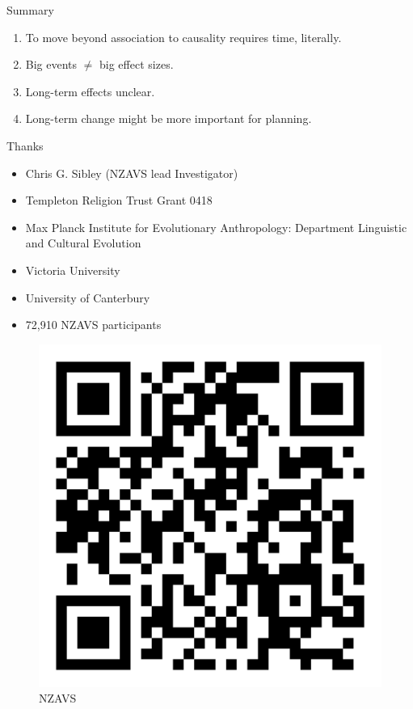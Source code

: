 \documentclass[
  ignorenonframetext,
  aspectratio=169,
]{beamer}
\providecommand{\tightlist}{%
  \setlength{\itemsep}{0pt}\setlength{\parskip}{0pt}}\usepackage{longtable,booktabs,array}
\begin{document}
\begin{frame}{Summary}
\label{summary}
\begin{enumerate}[<+->]
\tightlist
\item
  To move beyond association to causality requires time, literally.
\item
  Big events \(\neq\) big effect sizes.
\item
  Long-term effects unclear.
\item
  Long-term change might be more important for planning.
\end{enumerate}
\end{frame}

\begin{frame}{Thanks}
\label{thanks}
\begin{itemize}
\tightlist
\item
  Chris G. Sibley (NZAVS lead Investigator)
\item
  Templeton Religion Trust Grant 0418
\item
  Max Planck Institute for Evolutionary Anthropology: Department
  Linguistic and Cultural Evolution
\item
  Victoria University
\item
  University of Canterbury
\item
  72,910 NZAVS participants
\end{itemize}
\end{frame}

\begin{frame}
\begin{figure}[H]

{\centering \includegraphics{NZAVS-QR.png}

}

\caption{NZAVS}

\end{figure}%
\end{frame}
\end{document}
